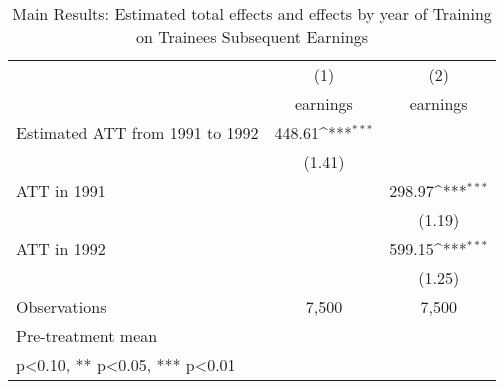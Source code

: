 \begin{table}[htbp]\centering
\def\sym#1{\ifmmode^{#1}\else\(^{#1}\)\fi}
\caption{Main Results: Estimated total effects and effects by year of Training on Trainees Subsequent Earnings}
\begin{tabular}{l*{2}{c}}
\toprule
                    &\multicolumn{1}{c}{(1)}&\multicolumn{1}{c}{(2)}\\
                    &\multicolumn{1}{c}{earnings}&\multicolumn{1}{c}{earnings}\\
\midrule
Estimated ATT from 1991 to 1992&      448.61\sym{***}&                     \\
                    &      (1.41)         &                     \\
ATT in 1991         &                     &      298.97\sym{***}\\
                    &                     &      (1.19)         \\
ATT in 1992         &                     &      599.15\sym{***}\\
                    &                     &      (1.25)         \\
\midrule
Observations        &       7,500         &       7,500         \\
Pre-treatment mean  &                     &                     \\
\bottomrule
\multicolumn{3}{l}{\footnotesize * p<0.10, ** p<0.05, *** p<0.01}\\
\end{tabular}
\end{table}
